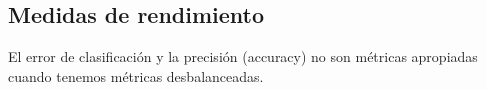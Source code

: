\documentclass[12pt, letterpaper]{article}
\begin{document}
\subsection{Medidas de rendimiento}
El error de clasificación y la precisión (accuracy) no son métricas apropiadas cuando tenemos métricas desbalanceadas. 
\end{document}
